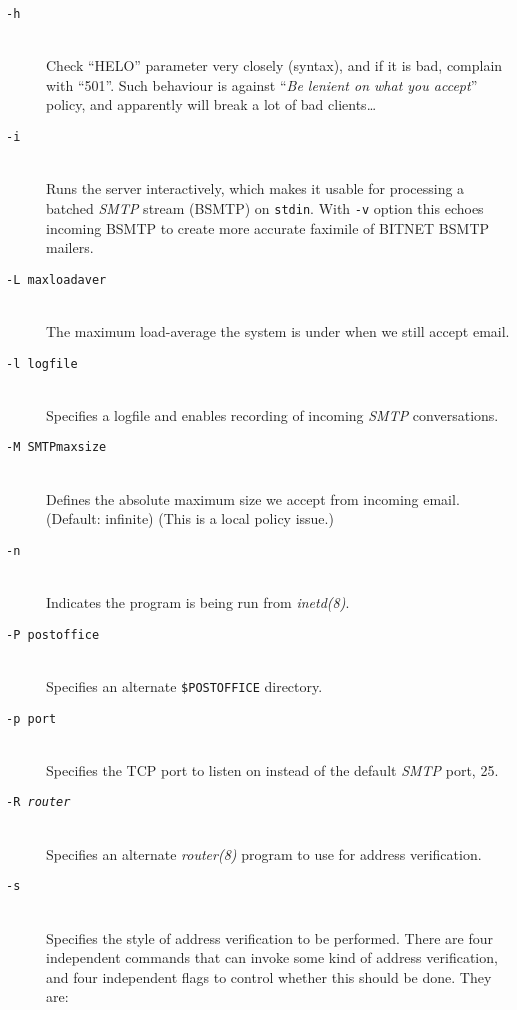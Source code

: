 \begin{description}
\item[\tt -h] \mbox{} \\
Check ``HELO'' parameter very closely (syntax), and if it is bad,
complain with ``501''.
Such behaviour is against ``{\em Be lenient on what you accept}'' policy,
and apparently will break a lot of bad clients\ldots

\item[\tt -i] \mbox{} \\
Runs the server interactively, which makes it usable for processing a batched 
{\em SMTP} stream (BSMTP) on {\tt stdin}. With {\tt -v} option this echoes incoming BSMTP to create more 
accurate faximile of BITNET BSMTP mailers.

\item[\tt -L maxloadaver] \mbox{} \\
The maximum load-average the system is under when we still accept email.

\item[\tt -l logfile] \mbox{} \\
Specifies a logfile and enables recording of incoming {\em SMTP} conversations.

\item[\tt -M SMTPmaxsize] \mbox{} \\
Defines the absolute maximum size we accept from incoming email. 
(Default: infinite) (This is a local policy issue.)

\item[\tt -n] \mbox{} \\
Indicates the program is being run from {\em inetd(8)}.

\item[\tt -P postoffice] \mbox{} \\
Specifies an alternate {\tt \$POSTOFFICE} directory.

\item[\tt -p port] \mbox{} \\
Specifies the TCP port to listen on instead of the default {\em SMTP} port, 25.

\item[\tt -R {\em router}] \mbox{} \\
Specifies an alternate {\em router(8)} program to use for address verification.

\item[\tt -s] \mbox{} \\
Specifies the style of address verification to be performed. There are four independent commands 
that can invoke some kind of address verification, and four independent flags to control whether this should be done. 
They are:


\end{description}
